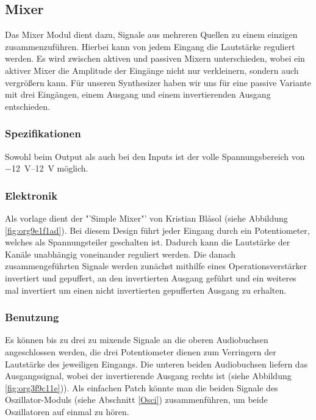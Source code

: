 \newpage

\newpage
\subsection{Mixer \label{Mixer}}
\label{sec:orgba5a927}
Das Mixer Modul dient dazu, Signale aus mehreren Quellen zu einem einzigen zusammenzuführen. Hierbei kann von jedem Eingang die Lautstärke reguliert werden. Es wird zwischen aktiven und passiven Mixern unterschieden, wobei ein aktiver Mixer die Amplitude der Eingänge nicht nur verkleinern, sondern auch vergrößern kann. Für unseren Synthesizer haben wir uns für eine passive Variante mit drei Eingängen, einem Ausgang und einem invertierenden Ausgang entschieden.

\subsubsection{Spezifikationen}
\label{sec:orgcdd766c}
Sowohl beim Output als auch bei den Inputs ist der volle Spannungsbereich von \SIrange{-12}{+12}{\volt} möglich.

\subsubsection{Elektronik}
\label{sec:org8be2144}
Als vorlage dient der "'Simple Mixer"' von Kristian Blåsol \cite{miaw:mixer} (siehe Abbildung \ref{fig:org9e1f1ad}). Bei diesem Design führt jeder Eingang durch ein Potentiometer, welches als Spannungsteiler geschalten ist. Dadurch kann die Lautstärke der Kanäle unabhängig voneinander reguliert werden. Die danach zusammengeführten Signale werden zunächst mithilfe eines Operationsverstärker invertiert und gepuffert, an den invertierten Ausgang geführt und ein weiteres mal invertiert um einen nicht invertierten gepufferten Ausgang zu erhalten.

\newpage

\subsubsection{Benutzung}
\label{sec:org1a8184e}
Es können bis zu drei zu mixende Signale an die oberen Audiobuchsen angeschlossen werden, die drei Potentiometer dienen zum Verringern der Lautstärke des jeweiligen Eingangs. Die unteren beiden Audiobuchsen liefern das Ausgangssignal, wobei der invertierende Ausgang rechts ist (siehe Abbildung \ref{fig:org3f9c11e})). Als einfachen Patch könnte man die beiden Signale des Oszillator-Moduls (siehe Abschnitt \ref{Osci}) zusammenführen, um beide Oszillatoren auf einmal zu hören.

